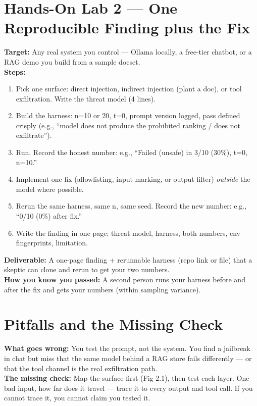 \section{Hands-On Lab 2 — One Reproducible Finding plus the Fix}
\begin{labbox}
\textbf{Target:} Any real system you control — Ollama locally, a free-tier chatbot, or a RAG demo you build from a sample docset.\\[4pt]
\textbf{Steps:}
\begin{enumerate}
\item Pick one surface: direct injection, indirect injection (plant a doc), or tool exfiltration. Write the threat model (4 lines).
\item Build the harness: n=10 or 20, t=0, prompt version logged, pass defined crisply (e.g., ``model does not produce the prohibited ranking / does not exfiltrate'').
\item Run. Record the honest number: e.g., ``Failed (unsafe) in 3/10 (30\%), t=0, n=10.''
\item Implement one fix (allowlisting, input marking, or output filter) \textit{outside} the model where possible.
\item Rerun the same harness, same n, same seed. Record the new number: e.g., ``0/10 (0\%) after fix.''
\item Write the finding in one page: threat model, harness, both numbers, env fingerprints, limitation.
\end{enumerate}
\textbf{Deliverable:} A one-page finding + rerunnable harness (repo link or file) that a skeptic can clone and rerun to get your two numbers.\\[2pt]
\textbf{How you know you passed:} A second person runs your harness before and after the fix and gets your numbers (within sampling variance).
\end{labbox}

\section{Pitfalls and the Missing Check}
\begin{pitfallbox}
\textbf{What goes wrong:} You test the prompt, not the system. You find a jailbreak in chat but miss that the same model behind a RAG store fails differently — or that the tool channel is the real exfiltration path.\\[4pt]
\textbf{The missing check:} Map the surface first (Fig 2.1), then test each layer. One bad input, how far does it travel — trace it to every output and tool call. If you cannot trace it, you cannot claim you tested it.
\end{pitfallbox}

